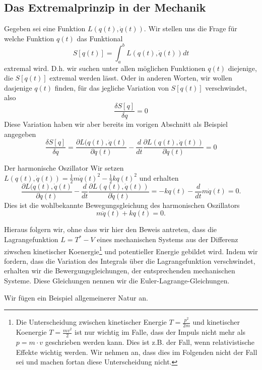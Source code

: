 \subsection{Das Extremalprinzip in der Mechanik}
Gegeben sei eine Funktion $L(q(t),\dot q(t))$. Wir stellen uns die Frage für
welche Funktion $q(t)$ das Funktional
\[
  S[q(t)]=\int_a^b L(q(t),\dot q(t)) dt
\]
extremal wird. D.h. wir suchen unter allen möglichen Funktionen $q(t)$
diejenige, die $S[q(t)]$ extremal werden lässt. Oder in anderen Worten, wir
wollen dasjenige $q(t)$ finden, für das jegliche Variation von $S[q(t)]$
verschwindet, also 
\[\frac{\delta S[q]}{\delta q}=0\]
Diese Variation haben wir aber bereits im vorigen Abschnitt als Beispiel angegeben
\[
  \frac{\delta S[q]}{\delta q}=\frac{\partial L(q(t),\dot q(t)}{\partial q(t)}
    -\frac{d}{dt} \frac{\partial L(q(t),\dot q(t))}{\partial \dot q(t)}=0
\]
\begin{note}{Der harmonische Oszillator}
Wir setzen $L(q(t),\dot q(t))=\frac{1}{2}m\dot
q(t)^2-\frac{1}{2}k q(t)^2$ und erhalten
\[ \frac{\partial L(q(t),\dot q(t)}{\partial q(t)}
    -\frac{d}{dt} \frac{\partial L(q(t),\dot q(t))}{\partial \dot q(t)}=
   -kq(t)-\frac{d}{dt}m\dot q(t)
   =0.
 \]
 Dies ist die wohlbekannte Bewegungsgleichung des harmonischen Oszillators\newline 
 \[m\ddot q(t)+kq(t)=0.\]

Hieraus folgern wir, ohne dass wir hier den Beweis antreten, dass die
Lagrangefunktion $L=T^*-V$ eines mechanischen Systems aus der Differenz
ziwschen kinetischer Koenergie\footnote{Die Unterscheidung zwischen kinetischer
  Energie $T=\frac{p^2}{2m}$ und kinetischer Koenergie $T=\frac{mv^2}{2}$ ist
  nur wichtig im Falle, dass der Impuls nicht mehr als $p=m\cdot v$ geschrieben
werden kann. Dies ist z.B. der Fall, wenn relativistische Effekte wichtig
werden. Wir nehmen an, dass dies im Folgenden nicht der Fall sei und machen
fortan diese Unterscheidung nicht.} 
%
und potentieller Energie gebildet wird. Indem wir fordern, dass die
Variation des Integrals über die Lagrangefunktion verschwindet, erhalten wir
die Bewergungsgleichungen, der entsprechenden mechanischen Systeme. Diese
Gleichungen nennen wir die Euler-Lagrange-Gleichungen.
\end{note}
Wir fügen ein Beispiel allgemeinerer Natur an.
